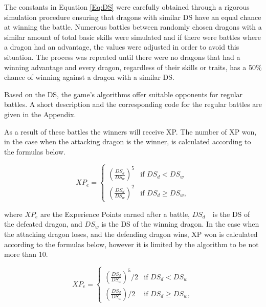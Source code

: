 \documentclass[12pt]{article}
\begin{document}
{The constants in Equation \ref{Eq:DS} were carefully obtained through a rigorous simulation procedure ensuring that dragons with similar DS have an equal chance at winning the battle. Numerous battles between randomly chosen dragons with a similar amount of total basic skills were simulated and if there were battles where a dragon had an advantage, the values were adjusted in order to avoid this situation. The process was repeated until there were no dragons that had a winning advantage and every dragon, regardless of their skills or traits, has a 50$\%$  chance of winning against a dragon with a similar DS.\par

Based on the DS, the game’s algorithms offer suitable opponents for regular battles. A short description and the corresponding code for the regular battles are given in the Appendix.\par

As a result of these battles the winners will receive XP. The number of XP won, in the case when the attacking dragon is the winner, is calculated according to the formulas below.\par


\begin{center}
  \begin{equation}
    XP_e= \begin{cases}
    \left(\frac{DS_{d}}{DS_{w}}\right)^5 & \mbox{if } DS_{d} < DS_{w}\\
    \left(\frac{DS_{d}}{DS_{w}}\right)^2 & \mbox{if } DS_{d} \geq DS_{w},
    \end{cases}
  \end{equation}
\end{center}

\vspace{\baselineskip}
where $XP_e$ are the Experience Points earned after a battle, $DS_{d}$\ \  is the DS of the defeated dragon, and $DS_{w}$ is the DS of the winning dragon. In the case when the attacking dragon loses, and the defending dragon wins, XP won is calculated according to the formulas below, however it is limited by the algorithm to be not more than 10.\par 

\begin{center}
	\begin{equation}
	XP_e= \begin{cases}
	\left(\frac{DS_{d}}{DS_{w}}\right)^5/2 & \mbox{if } DS_{d} < DS_{w}\\
	\left(\frac{DS_{d}}{DS_{w}}\right)/2 & \mbox{if } DS_{d} \geq DS_{w},
	\end{cases}
	\end{equation}
\end{center}

}
\end{document}
